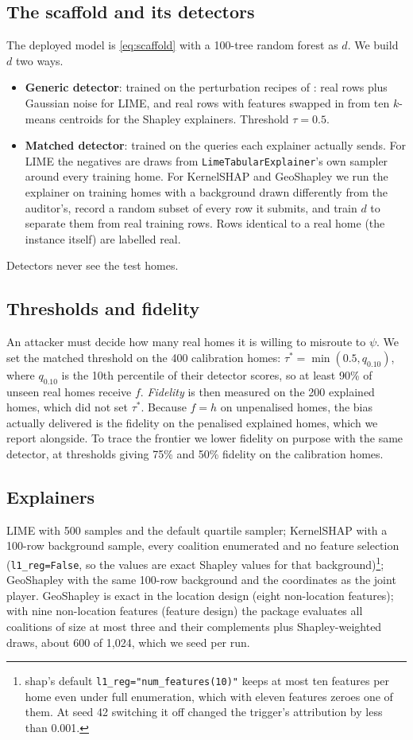 \documentclass[11pt]{article}
\newcommand{\1}{\mathbf{1}}
\begin{document}
\subsection{The scaffold and its detectors}
The deployed model is \eqref{eq:scaffold} with a 100-tree random forest as $d$. We build $d$ two ways.
\begin{itemize}
  \item \textbf{Generic detector}: trained on the perturbation recipes of \citet{slack2020fooling}: real rows plus
        Gaussian noise for LIME, and real rows with features swapped in from ten $k$-means centroids for the Shapley
        explainers. Threshold $\tau = 0.5$.
  \item \textbf{Matched detector}: trained on the queries each explainer actually sends. For LIME the negatives are
        draws from \texttt{LimeTabularExplainer}'s own sampler around every training home. For KernelSHAP and
        GeoShapley we run the explainer on training homes with a background drawn differently from the auditor's,
        record a random subset of every row it submits, and train $d$ to separate them from real training rows. Rows
        identical to a real home (the instance itself) are labelled real.
\end{itemize}
Detectors never see the test homes.

\subsection{Thresholds and fidelity}\label{sec:thresholds}
An attacker must decide how many real homes it is willing to misroute to $\psi$. We set the matched threshold on the
400 calibration homes: $\tau^* = \min(0.5, q_{0.10})$, where $q_{0.10}$ is the 10th percentile of their detector
scores, so at least 90\% of unseen real homes receive $f$. \emph{Fidelity} is then measured on the 200 explained homes,
which did not set $\tau^*$. Because $f = h$ on unpenalised homes, the bias actually delivered is the fidelity on the
penalised explained homes, which we report alongside. To trace the frontier we lower fidelity on purpose with the same
detector, at thresholds giving 75\% and 50\% fidelity on the calibration homes.

\subsection{Explainers}
LIME with 500 samples and the default quartile sampler; KernelSHAP with a 100-row background sample, every coalition
enumerated and no feature selection (\texttt{l1\_reg=False}, so the values are exact Shapley values for that
background)\footnote{shap's default \texttt{l1\_reg="num\_features(10)"} keeps at most ten features per home even under
full enumeration, which with eleven features zeroes one of them. At seed 42 switching it off changed the trigger's
attribution by less than 0.001.}; GeoShapley with the same 100-row background and the coordinates as the joint player.
GeoShapley is exact in the location design (eight non-location features); with nine non-location features (feature
design) the package evaluates all coalitions of size at most three and their complements plus Shapley-weighted draws,
about 600 of 1,024, which we seed per run.
\end{document}
